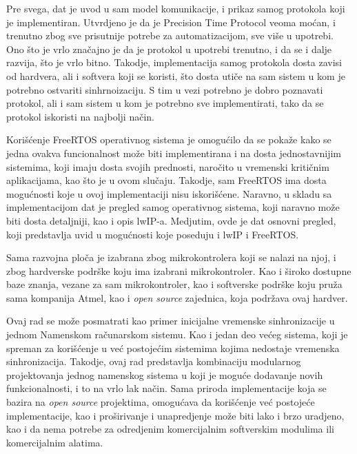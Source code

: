 \documentclass[a4paper,12pt, master]{etf}
\begin{document}
	Pre svega, dat je uvod u sam model komunikacije, i prikaz samog protokola
	koji je implementiran. Utvrdjeno je da je Precision Time Protocol veoma
	mo\'{c}an, i trenutno zbog sve prisutnije potrebe za automatizacijom, sve
	vi\v{s}e u upotrebi. Ono \v{s}to je vrlo zna\v{c}ajno je da je protokol u
	upotrebi trenutno, i da se i dalje razvija, \v{s}to je vrlo bitno. Takodje,
	implementacija samog protokola dosta zavisi od hardvera, ali i softvera
	koji se koristi, \v{s}to dosta uti\v{c}e na sam sistem u kom je potrebno
	ostvariti sinhrnoizaciju. S tim u vezi potrebno je dobro poznavati protokol,
	 ali i sam sistem u kom je potrebno sve implementirati, tako da se protokol
	iskoristi na najbolji na\v{c}in.

	Kori\v{s}\'{c}enje FreeRTOS operativnog sistema je omogu\'{c}ilo da se
	poka\v{z}e kako se jedna ovakva funcionalnost mo\v{z}e biti implementirana
	i na dosta jednostavnijim sistemima, koji imaju dosta svojih prednosti,
	naro\v{c}ito u vremenski kriti\v{c}nim aplikacijama, kao \v{s}to je u ovom
	slu\v{c}aju. Takodje, sam FreeRTOS ima dosta mogu\'{c}nosti koje u ovoj
	implementaciji nisu iskori\v{s}\'{c}ene. Naravno, u skladu sa
	implementacijom dat je pregled samog operativnog sistema, koji naravno
	mo\v{z}e biti dosta detaljniji, kao i opis lwIP-a. Medjutim, ovde je dat
	osnovni pregled, koji predstavlja uvid u mogu\'{c}nosti koje poseduju i lwIP
    i FreeRTOS.

	Sama razvojna plo\v{c}a je izabrana zbog mikrokontrolera koji se nalazi na
	njoj, i zbog hardverske podr\v{s}ke koju ima izabrani mikrokontroler. Kao i
	\v{s}iroko dostupne baze znanja, vezane za sam mikrokontroler, kao i
	softverske podr\v{s}ke koju pru\v{z}a sama kompanija Atmel, kao i
	\textit{open source} zajednica, koja podr\v{z}ava ovaj hardver.

	Ovaj rad se mo\v{z}e posmatrati kao primer inicijalne vremenske
	sinhronizacije u jednom Namenskom ra\v{c}unarskom sistemu. Kao i jedan deo
	ve\'{c}eg sistema, koji je spreman za kori\v{s}\'{c}enje u ve\'{c}
	postoje\'{c}im sistemima kojima nedostaje vremenska sinhronizacija. Takodje,
	 ovaj rad predstavlja kombinaciju modularnog projektovanja jednog namenskog
	sistema u koji je mogu\'{c}e dodavanje novih funkcionalnosti, i to na vrlo
	lak na\v{c}in. Sama priroda implementacije koja se bazira na
	\textit{open source} projektima, omogu\'{c}ava da kori\v{s}\'{c}enje
	ve\'{c} postoje\'{c}e implementacije, kao i pro\v{s}irivanje i unapredjenje
	mo\v{z}e biti lako i brzo uradjeno, kao i da nema potrebe za odredjenim
	komercijalnim softverskim modulima ili komercijalnim alatima.
\end{document}

